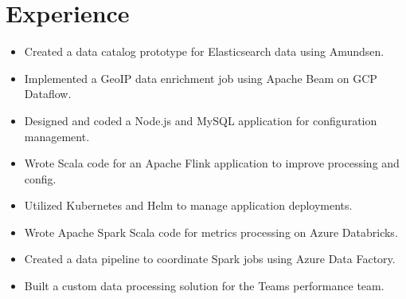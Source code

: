 \documentclass[letterpaper]{resume}
\begin{document}
\hfill
%
%
\begin{minipage}[t]{0.72\textwidth} %


\section{Experience}

\begin{itemize}
\item Created a data catalog prototype for Elasticsearch data using Amundsen.
\item Implemented a GeoIP data enrichment job using Apache Beam on GCP Dataflow.
\item Designed and coded a Node.js and MySQL application for configuration management.
\item Wrote Scala code for an Apache Flink application to improve processing and config.
\item Utilized Kubernetes and Helm to manage application deployments.
\end{itemize}

\sectionspace %


\begin{itemize}
\item Wrote Apache Spark Scala code for metrics processing on Azure Databricks.
\item Created a data pipeline to coordinate Spark jobs using Azure Data Factory.
\item Built a custom data processing solution for the Teams performance team.
\end{itemize}

\sectionspace %


\end{minipage}
\end{document}
